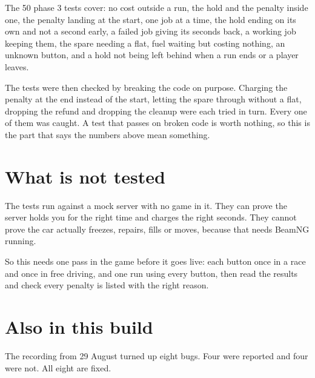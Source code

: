 \documentclass[11pt,a4paper]{article}
\begin{document}
The 50 phase 3 tests cover: no cost outside a run, the hold and the penalty
inside one, the penalty landing at the start, one job at a time, the hold ending
on its own and not a second early, a failed job giving its seconds back, a
working job keeping them, the spare needing a flat, fuel waiting but costing
nothing, an unknown button, and a hold not being left behind when a run ends or
a player leaves.

The tests were then checked by breaking the code on purpose. Charging the
penalty at the end instead of the start, letting the spare through without a
flat, dropping the refund and dropping the cleanup were each tried in turn.
Every one of them was caught. A test that passes on broken code is worth
nothing, so this is the part that says the numbers above mean something.

\section{What is not tested}

The tests run against a mock server with no game in it. They can prove the
server holds you for the right time and charges the right seconds. They cannot
prove the car actually freezes, repairs, fills or moves, because that needs
BeamNG running.

So this needs one pass in the game before it goes live: each button once in a
race and once in free driving, and one run using every button, then read the
results and check every penalty is listed with the right reason.

\section{Also in this build}

The recording from 29 August turned up eight bugs. Four were reported and four
were not. All eight are fixed.
\end{document}
